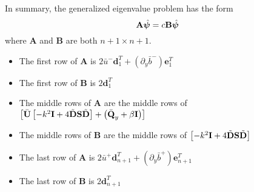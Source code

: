 \documentclass[10pt]{article}
\newcommand{\pd}[1]{\partial_{#1}}
\newcommand{\mat}[1]{\text{\bf #1}}
\begin{document}
In summary, the generalized eigenvalue problem has the form
\[\mat{A}\hat{\bm{\psi}} = c\mat{B}\hat{\bm{\psi}}\]
where {\bf A} and {\bf B} are both $n+1\times n+1$.
\begin{itemize}
\item The first row of {\bf A} is $2\bar{u}^-\bm{d}_1^T+(\pd{y}\bar{b}^-)\bm{e}_1^T$
\item The first row of {\bf B} is $2\bm{d}_1^T$
\item The middle rows of {\bf A} are the middle rows of $\left[\bar{\mat{U}}\left[-k^2\mat{I}+4\tilde{\mat{D}}\mat{S}\tilde{\mat{D}}\right] +\left(\bar{\mat{Q}}_y+\beta\mat{I}\right)\right]$
\item The middle rows of {\bf B} are the middle rows of $\left[-k^2\mat{I}+4\tilde{\mat{D}}\mat{S}\tilde{\mat{D}}\right]$
\item The last row of {\bf A} is $2\bar{u}^+\bm{d}_{n+1}^T+(\pd{y}\bar{b}^+)\bm{e}_{n+1}^T$
\item The last row of {\bf B} is $2\bm{d}_{n+1}^T$
\end{itemize}
\end{document}
